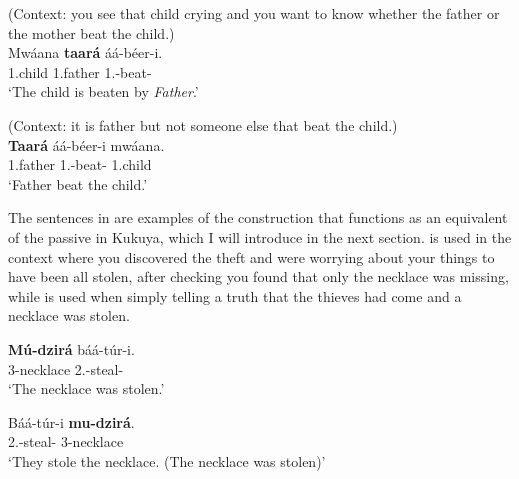 \documentclass[output=paper,colorlinks,citecolor=brown,
]{langscibook}
\begin{document}
\begin{exe}
     \ex \label{78}
    \begin{xlist}
\ex
\label{78a}
 (Context: you see that child crying and you want to know whether the father or the mother beat the child.) \\
\gll
Mwáana \textbf{taará} áá-béer-i.\\
1.child 1.father 1\Sm{}.\Pst{}-beat-\Pst{}\\
\trans ‘The child is beaten by \textit{Father}.’

\ex
\label{78b}
 (Context: it is father but not someone else that beat the child.) \\
\gll
\textbf{Taará} áá-béer-i mwáana.\\
1.father 1\Sm{}.\Pst{}-beat-\Pst{} 1.child\\
\trans ‘Father beat the child.’

    \end{xlist}
\end{exe}
The sentences in  are examples of the construction that functions as an equivalent of the passive in Kukuya, which I will introduce in the next section.  is used in the context where you discovered the theft and were worrying about your things to have been all stolen, after checking you found that only the necklace was missing, while  is used when simply telling a truth that the thieves had come and a necklace was stolen. 
\begin{exe}
     \ex \label{79}
    \begin{xlist}
\ex
\label{79a}
\gll
\textbf{Mú-dzirá} báá-túr-i.\\
3-necklace 2\Sm{}.\Pst{}-steal-\Pst{}\\
\trans ‘The necklace was stolen.’

\ex
\label{79b}
\gll
Báá-túr-i \textbf{mu-dzirá}.\\
2\Sm{}.\Pst{}-steal-\Pst{} 3-necklace\\
\trans ‘They stole the necklace. (The necklace was stolen)’

    \end{xlist}
\end{exe}
\end{document}
